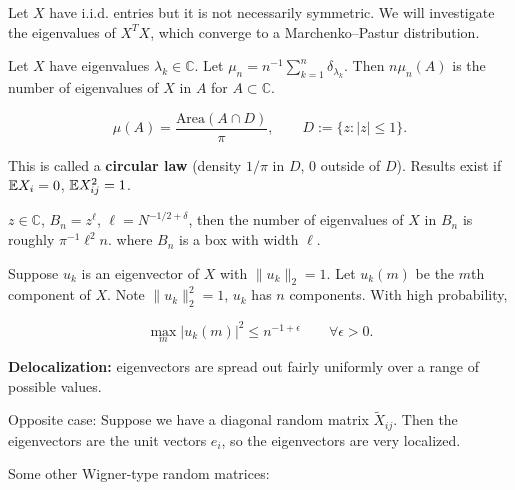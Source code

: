 Let \(X\) have i.i.d. entries but it is not necessarily symmetric. We will investigate the eigenvalues of \(X^TX\), which converge to a Marchenko–Pastur distribution.

Let \(X\) have eigenvalues \(\lambda_k \in \mathbb{C}\). Let \(\mu_n = n^{-1} \sum_{k=1}^n \delta_{\lambda_k}\). Then \( n \mu_n(A)\) is the number of eigenvalues of \(X\) in \(A\) for \(A \subset \mathbb{C}\).

\[
\mu(A) = \frac{ \text{Area}(A \cap D)}{\pi}, \qquad D:= \{z: |z | \leq 1\}.
\]

This is called a \textbf{circular law} (density \(1/\pi\) in \(D\), 0 outside of \(D\)). Results exist if \(\mathbb{E} X_i = 0\), \(\mathbb{E} X_{ij}^2 = 1\). 

\begin{proposition}

\(z \in \mathbb{C}\), \(B_n = z^\ell\), \(\ell = N^{-1/2 + \delta}\), then the number of eigenvalues of \(X\) in \(B_n\) is roughly \(\pi^{-1} \ell^2 n\). where \(B_n\) is a box with width \(\ell\).

\end{proposition}

\begin{proposition}

Suppose \(u_k\) is an eigenvector of \(X\) with \(\lVert u_k \rVert_2 = 1\). Let \(u_k(m)\) be the \(m\)th component of \(X\). Note \(\lVert u_k \rVert_2^2 = 1\), \(u_k\) has \(n\) components. With high probability,

\[
\max_m | u_k(m) |^2 \leq n^{-1 + \epsilon} \qquad \forall \epsilon > 0.
\]

\end{proposition}

\textbf{Delocalization:} eigenvectors are spread out fairly uniformly over a range of possible values.

Opposite case: Suppose we have a diagonal random matrix \(\tilde{X}_{ij}\). Then the eigenvectors are the unit vectors \(e_i\), so the eigenvectors are very localized. 

Some other Wigner-type random matrices:

